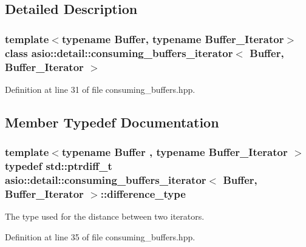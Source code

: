 \subsection{Detailed Description}
\subsubsection*{template$<$typename Buffer, typename Buffer\+\_\+\+Iterator$>$class asio\+::detail\+::consuming\+\_\+buffers\+\_\+iterator$<$ Buffer, Buffer\+\_\+\+Iterator $>$}



Definition at line 31 of file consuming\+\_\+buffers.\+hpp.



\subsection{Member Typedef Documentation}
\hypertarget{classasio_1_1detail_1_1consuming__buffers__iterator_ae0f3c33c5ca70ab6fb129299f6092b78}{}
\subsubsection[{difference\+\_\+type}]{\setlength{\rightskip}{0pt plus 5cm}template$<$typename Buffer , typename Buffer\+\_\+\+Iterator $>$ typedef std\+::ptrdiff\+\_\+t {\bf asio\+::detail\+::consuming\+\_\+buffers\+\_\+iterator}$<$ Buffer, Buffer\+\_\+\+Iterator $>$\+::{\bf difference\+\_\+type}}\label{classasio_1_1detail_1_1consuming__buffers__iterator_ae0f3c33c5ca70ab6fb129299f6092b78}


The type used for the distance between two iterators. 



Definition at line 35 of file consuming\+\_\+buffers.\+hpp.

\hypertarget{classasio_1_1detail_1_1consuming__buffers__iterator_a23bcf111a9ac4efe9ce2daebd4bd11c9}{}

